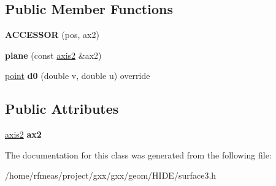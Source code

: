 \subsection*{Public Member Functions}
\begin{DoxyCompactItemize}
\item 
{\bfseries A\+C\+C\+E\+S\+S\+OR} (pos, ax2)\hypertarget{classgxx_1_1surf3_1_1plane_a337b8cac9ac98d3e4f8c6f20f0301dde}{}\label{classgxx_1_1surf3_1_1plane_a337b8cac9ac98d3e4f8c6f20f0301dde}

\item 
{\bfseries plane} (const \hyperlink{classgxx_1_1geom3_1_1axis2}{axis2} \&ax2)\hypertarget{classgxx_1_1surf3_1_1plane_a1e0309f6c3c0fa2d71b67ed413e9ad4f}{}\label{classgxx_1_1surf3_1_1plane_a1e0309f6c3c0fa2d71b67ed413e9ad4f}

\item 
\hyperlink{classgxx_1_1geom3_1_1point}{point} {\bfseries d0} (double v, double u) override\hypertarget{classgxx_1_1surf3_1_1plane_a16681dab3415d2f21745d2c585374998}{}\label{classgxx_1_1surf3_1_1plane_a16681dab3415d2f21745d2c585374998}

\end{DoxyCompactItemize}
\subsection*{Public Attributes}
\begin{DoxyCompactItemize}
\item 
\hyperlink{classgxx_1_1geom3_1_1axis2}{axis2} {\bfseries ax2}\hypertarget{classgxx_1_1surf3_1_1plane_a5e7d2ce96718acf90ced2830e74c996d}{}\label{classgxx_1_1surf3_1_1plane_a5e7d2ce96718acf90ced2830e74c996d}

\end{DoxyCompactItemize}


The documentation for this class was generated from the following file\+:\begin{DoxyCompactItemize}
\item 
/home/rfmeas/project/gxx/gxx/geom/\+H\+I\+D\+E/surface3.\+h\end{DoxyCompactItemize}
